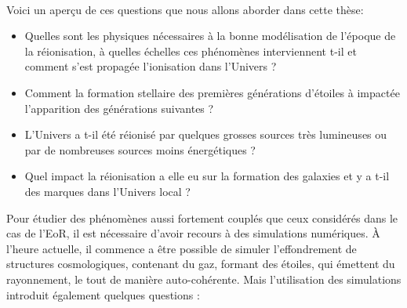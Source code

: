 %


\paragraph{}
Voici un aperçu de ces questions que nous allons aborder dans cette thèse: 

\begin{itemize}
\item Quelles sont les physiques nécessaires à la bonne modélisation de l'époque de la réionisation, à quelles échelles ces phénomènes interviennent t-il et comment s'est propagée l'ionisation dans l'Univers ?
\item Comment la formation stellaire des premières générations d'étoiles à impactée l'apparition des générations suivantes ? %
\item L'Univers a t-il été réionisé par quelques grosses sources très lumineuses ou par de nombreuses sources moins énergétiques ?
\item Quel impact la réionisation a elle eu sur la formation des galaxies et y a t-il des marques dans l'Univers local ?
\end{itemize}

Pour étudier des phénomènes aussi fortement couplés que ceux considérés dans le cas de l'\ac{EoR}, il est nécessaire d'avoir recours à des simulations numériques. 
À l'heure actuelle, il commence a être possible de simuler l'effondrement de structures cosmologiques, contenant du gaz, formant des étoiles, qui émettent du rayonnement, le tout de manière auto-cohérente.
Mais l'utilisation des simulations introduit également quelques questions : 

